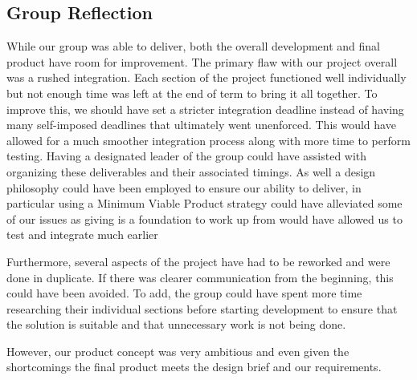 \subsection{Group Reflection}

While our group was able to deliver, both the overall development and final product have room for improvement.
The primary flaw with our project overall was a rushed integration.
Each section of the project functioned well individually but not enough time was left at the end of term to bring it all together.
To improve this, we should have set a stricter integration deadline instead of having many self-imposed deadlines that ultimately went unenforced.
This would have allowed for a much smoother integration process along with more time to perform testing.
Having a designated leader of the group could have assisted with organizing these deliverables and their associated timings.
As well a design philosophy could have been employed to ensure our ability to deliver,
in particular using a Minimum Viable Product strategy could have alleviated some of our issues as giving is a foundation to work up from would have allowed us to test and integrate much earlier

Furthermore, several aspects of the project have had to be reworked and were done in duplicate.
If there was clearer communication from the beginning, this could have been avoided.
To add, the group could have spent more time researching their individual sections before starting development to ensure that the solution is suitable
and that unnecessary work is not being done.

However, our product concept was very ambitious and even given the shortcomings the final product meets the design brief and our requirements.
